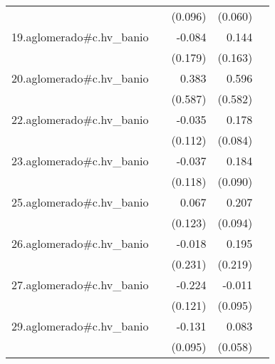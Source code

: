 {\begin{longtable}{l*{4}{D{.}{.}{-1}}}
            &                     &     (0.096)         &     (0.060)         &                     \\
\addlinespace
19.aglomerado#c.hv\_banio&                     &      -0.084         &       0.144         &                     \\
            &                     &     (0.179)         &     (0.163)         &                     \\
\addlinespace
20.aglomerado#c.hv\_banio&                     &       0.383         &       0.596         &                     \\
            &                     &     (0.587)         &     (0.582)         &                     \\
\addlinespace
22.aglomerado#c.hv\_banio&                     &      -0.035         &       0.178\sym{*}  &                     \\
            &                     &     (0.112)         &     (0.084)         &                     \\
\addlinespace
23.aglomerado#c.hv\_banio&                     &      -0.037         &       0.184\sym{*}  &                     \\
            &                     &     (0.118)         &     (0.090)         &                     \\
\addlinespace
25.aglomerado#c.hv\_banio&                     &       0.067         &       0.207\sym{*}  &                     \\
            &                     &     (0.123)         &     (0.094)         &                     \\
\addlinespace
26.aglomerado#c.hv\_banio&                     &      -0.018         &       0.195         &                     \\
            &                     &     (0.231)         &     (0.219)         &                     \\
\addlinespace
27.aglomerado#c.hv\_banio&                     &      -0.224         &      -0.011         &                     \\
            &                     &     (0.121)         &     (0.095)         &                     \\
\addlinespace
29.aglomerado#c.hv\_banio&                     &      -0.131         &       0.083         &                     \\
            &                     &     (0.095)         &     (0.058)         &                     \\

\end{longtable}}
